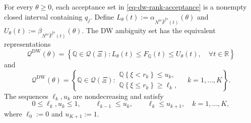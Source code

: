 \begin{proposition}
  \label{prop-finite-rank-constraints}
  For every $\theta\ge0$, each acceptance set in \eqref{eq-dw-rank-acceptance} is a nonempty closed interval containing $q_j$. Define
  $L_\theta(t):=\alpha_{N^{\mathrm{te}}\widehat F^{\mathrm{te}}(t)}(\theta)$ and
  $U_\theta(t):=\beta_{N^{\mathrm{te}}\widehat F^{\mathrm{te}}(t)}(\theta)$.
  The DW ambiguity set has the equivalent representations
  \begin{equation}
    \mathscr Q^{\mathrm{DW}}(\theta)
    =\left\{\mathbb Q\in\mathcal Q(\Xi):
    L_\theta(t)\le F_{\mathbb Q}(t)\le U_\theta(t),\quad\forall t\in\mathbb R\right\}
    \label{eq-dw-band-representation}
  \end{equation}
  and
  \begin{equation}
    \mathscr Q^{\mathrm{DW}}(\theta)
    =\left\{\mathbb Q\in\mathcal Q(\Xi):
    \begin{array}{l}
      \mathbb Q\left\{\xi<r_k\right\}\le u_k,\\
      \mathbb Q\left\{\xi\le r_k\right\}\ge\ell_k,
    \end{array}
    \quad k=1,\ldots,K\right\}.
    \label{eq-finite-rank-constraints}
  \end{equation}
  The sequences $\ell_k,u_k$ are nondecreasing and satisfy
  \begin{equation}
    0\le\ell_k,u_k\le1,\qquad
    \ell_{k-1}\le u_k,\qquad \ell_k\le u_{k+1},
    \quad k=1,\ldots,K,
    \label{eq-rank-compatibility}
  \end{equation}
  where $\ell_0:=0$ and $u_{K+1}:=1$.
\end{proposition}
